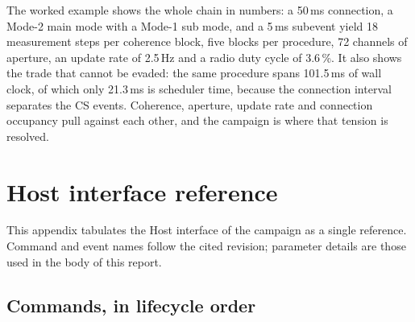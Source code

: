 \documentclass[11pt,a4paper]{article}
\begin{document}
The worked example shows the whole chain in numbers: a 50\,ms connection, a Mode-2 main mode with a
Mode-1 sub mode, and a 5\,ms subevent yield 18 measurement steps per coherence block, five blocks per
procedure, 72 channels of aperture, an update rate of 2.5\,Hz and a radio duty cycle of 3.6\,\%. It
also shows the trade that cannot be evaded: the same procedure spans 101.5\,ms of wall clock, of which
only 21.3\,ms is scheduler time, because the connection interval separates the CS events. Coherence,
aperture, update rate and connection occupancy pull against each other, and the campaign is where
that tension is resolved.

\appendix
\section{Host interface reference}
\label{app:hci}

This appendix tabulates the Host interface of the campaign as a single reference. Command and event
names follow the cited revision; parameter details are those used in the body of this report.

\subsection{Commands, in lifecycle order}
\end{document}
